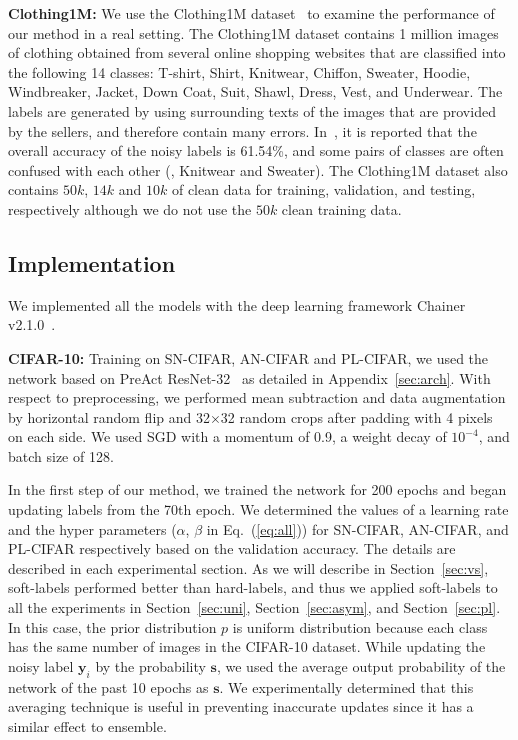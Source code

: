 \documentclass[10pt,twocolumn,letterpaper]{article}
\newcommand{\Eref}[1]{Eq.~(\ref{#1})}
\newcommand{\Sref}[1]{Section~\ref{#1}}
\newcommand{\APref}[1]{Appendix~\ref{#1}}
\begin{document}
\vspace{2mm}\noindent\textbf{Clothing1M:}
We use the Clothing1M dataset~\cite{xiao2015learning} to examine the performance of our method in a real setting.
The Clothing1M dataset contains 1 million images of clothing obtained from several online shopping websites that are classified into the following 14 classes: T-shirt, Shirt, Knitwear, Chiffon, Sweater, Hoodie, Windbreaker, Jacket, Down Coat, Suit, Shawl, Dress, Vest, and Underwear.
The labels are generated by using surrounding texts of the images that are provided by the sellers, and therefore contain many errors.
In~\cite{xiao2015learning}, it is reported that the overall accuracy of the noisy labels is 61.54\%, and some pairs of classes are often confused with each other (\eg, Knitwear and Sweater).
The Clothing1M dataset also contains $50k$, $14k$ and $10k$ of clean data for training, validation, and testing, respectively although we do not use the $50k$ clean training data.

\subsection{Implementation}
We implemented all the models with the deep learning framework Chainer v2.1.0~\cite{tokui2015chainer}.

\vspace{2mm}\noindent\textbf{CIFAR-10:}
Training on SN-CIFAR, AN-CIFAR and PL-CIFAR, we used the network based on PreAct ResNet-32~\cite{he2016identity} as detailed in \APref{sec:arch}.
With respect to preprocessing, we performed mean subtraction and data augmentation by horizontal random flip and 32$\times$32 random crops after padding with 4 pixels on each side. We used SGD with a momentum of 0.9, a weight decay of $10^{-4}$, and batch size of 128.

In the first step of our method, we trained the network for 200 epochs and began updating labels from the 70th epoch. We determined the values of a learning rate and the hyper parameters ($\alpha$, $\beta$ in \Eref{eq:all}) for SN-CIFAR, AN-CIFAR, and PL-CIFAR respectively based on the validation accuracy. The details are described in each experimental section. As we will describe in \Sref{sec:vs}, soft-labels performed better than hard-labels, and thus we applied soft-labels to all the experiments in \Sref{sec:uni}, \Sref{sec:asym}, and \Sref{sec:pl}.
In this case, the prior distribution $p$ is uniform distribution because each class has the same number of images in the CIFAR-10 dataset.
While updating the noisy label $\bm{y}_i$ by the probability $\bm{s}$, we used the average output probability of the network of the past 10 epochs as $\bm{s}$. We experimentally determined that this averaging technique is useful in preventing inaccurate updates since it has a similar effect to ensemble.
\end{document}
